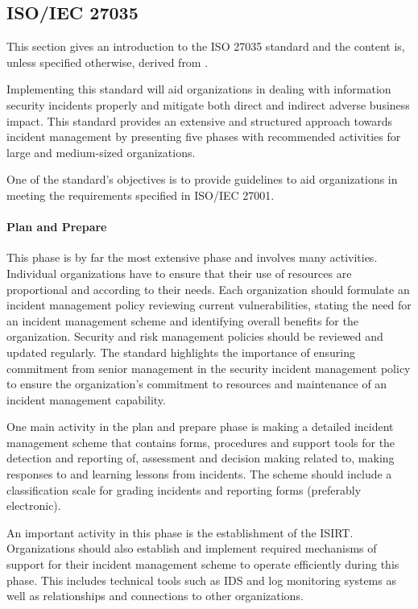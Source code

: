 \subsection{\acs{ISO}/\acs{IEC} 27035}
This section gives an introduction to the ISO 27035 standard and the content is, unless specified otherwise, derived from \cite{ISO/IEC27035}. 

Implementing this standard will aid organizations in dealing with information security incidents properly and mitigate both direct and indirect adverse business impact. This standard provides an extensive and structured approach towards incident management by presenting five phases with recommended activities for large and medium-sized organizations. 

One of the standard's objectives is to provide guidelines to aid organizations in meeting the requirements specified in ISO/IEC 27001. %

\paragraph{Plan and Prepare} This phase is by far the most extensive phase and involves many activities. Individual organizations have to ensure that their use of resources are proportional and according to their needs. Each organization should formulate an incident management policy reviewing current vulnerabilities, stating the need for an incident management scheme and identifying overall benefits for the organization. Security and risk management policies should be reviewed and updated regularly. The standard highlights the importance of ensuring commitment from senior management in the security incident management policy to ensure the organization's commitment to resources and maintenance of an incident management capability.  

One main activity in the plan and prepare phase is making a detailed incident management scheme that contains forms, procedures and support tools for the detection and reporting of, assessment and decision making related to, making responses to and learning lessons from incidents. The scheme should include a classification scale for grading incidents and reporting forms (preferably electronic).   

An important activity in this phase is the establishment of the \acf{ISIRT}. Organizations should also establish and implement required mechanisms of support for their incident management scheme to operate efficiently during this phase. This includes technical tools such as IDS and log monitoring systems as well as relationships and connections to other organizations. 

